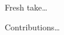 
Fresh take\ldots

Contributions\ldots




\begin{comment}
Software developers are often confronted with maintenance tasks that involve
navigation of repositories that preserve vast amounts of project history.
Navigating these software repositories can be a time-consuming task, because
their organization can be difficult to understand.  A software developer who is
tasked with changing a large software system spends effort on program
comprehension activities to gain the knowledge needed to make the
change~\cite{Corbi:1989}.  Fortunately, topic models such as latent Dirichlet
allocation (LDA)~\cite{Blei-etal:2003} can help developers to navigate and
understand software repositories by discovering topics (word distributions) that
reveal the thematic structure of the
data~\cite{Linstead-etal:2007,Thomas-etal:2011,Hindle-etal:2014}.

One particular application of topic models is for \emph{feature location}.
Feature location is the act of identifying the source code that implements
a system feature.  The current state-of-the-practice for feature location is to
use a keyword search tool, such as \texttt{grep}.  Ko et al.~\cite{Ko-etal:2006}
show that developers fail using this type of searching upwards to 88\% of the
time.  Text retrieval techniques, such as topic modeling, show promise in
remedying this problem~\cite{Marcus-etal:2004}.

Typical topic-modeling-based feature location techniques (FLT) construct models
from corpora of text extracted from a source code
snapshot~\cite{Dit-etal:2011}.  To use a topic-modeling-based FLT, there are
generally two key steps: training and indexing.  In the first step, a corpus of
source code entities, such as methods or classes, are used to train the model to
learn word co-occurences within those entities.  The indexing step uses the
trained model to construct an index of the source code entities based on their
inferred topic distribution.  That is, an index is made of each source code's
\emph{thematic structure}, and not it's raw content.  Keeping such a model and
index up-to-date is expensive, because the frequency and scope of source code
changes, such as file removal, necessitate retraining the model on the updated
corpus and reindexing.  This situation is sub-optimal whether your perspective
is academic research or industrial tool-building.  Like Rao et
al.~\cite{Rao-etal:2013}, our primary research goal is elimination of this cost.
However, unlike Rao et al., we do not intend to develop new topic modeling
techniques, but rather use the existing ones.


\end{comment}
